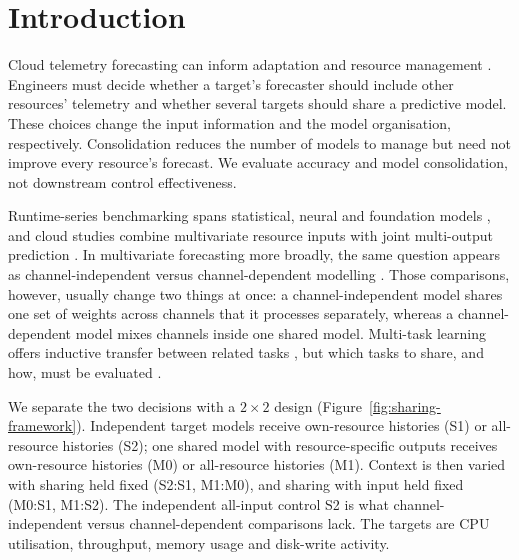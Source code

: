 \documentclass[5p,twocolumn]{elsarticle}
\begin{document}
\section{Introduction}
\label{sec:introduction}

Cloud telemetry forecasting can inform adaptation and resource management
\citep{Taherizadeh2018Monitoring,Bauer2020SelfAware}. Engineers must decide
whether a target's forecaster should include other resources' telemetry and
whether several targets should share a predictive model. These choices change
the input information and the model organisation, respectively.
Consolidation reduces the number of models to manage but need not improve
every resource's forecast. We evaluate accuracy and model consolidation, not
downstream control effectiveness.

Runtime-series benchmarking spans statistical, neural and foundation models
\citep{DiMenna2026RuntimeForecasting}, and cloud studies combine multivariate
resource inputs with joint multi-output prediction
\citep{Ullah2023CloudBiLSTM,Tripathi2025MMRP}. In multivariate forecasting
more broadly, the same question appears as channel-independent versus
channel-dependent modelling \citep{Han2024ChannelIndependent}. Those
comparisons, however, usually change two things at once: a
channel-independent model shares one set of weights across channels that it
processes separately, whereas a channel-dependent model mixes channels inside
one shared model. Multi-task learning offers inductive transfer between
related tasks \citep{Caruana1997Multitask}, but which tasks to share, and
how, must be evaluated
\citep{Standley2020TaskGrouping,Fifty2021TaskGroupings,Nochumsohn2025MTLinear}.

We separate the two decisions with a $2\times2$ design
(Figure~\ref{fig:sharing-framework}). Independent target models receive
own-resource histories (S1) or all-resource histories (S2); one shared model
with resource-specific outputs receives own-resource histories (M0) or
all-resource histories (M1). Context is then varied with sharing held fixed
(S2:S1, M1:M0), and sharing with input held fixed (M0:S1, M1:S2). The
independent all-input control S2 is what channel-independent versus
channel-dependent comparisons lack. The targets are CPU utilisation,
throughput, memory usage and disk-write activity.
\end{document}
